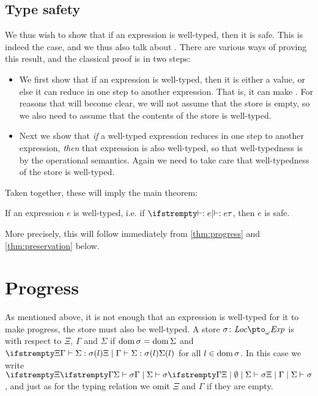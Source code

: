 \subsection{Type safety}

We thus wish to show that if an expression is well-typed, then it is safe. This is indeed the case, and we thus also talk about . There are various ways of proving this result, and the classical proof is in two steps:
%
\begin{itemize}
    \item We first show that if an expression is well-typed, then it is either a value, or else it can reduce in one step to another expression. That is, it can make . For reasons that will become clear, we will not assume that the store is empty, so we also need to assume that the contents of the store is well-typed.

    \item Next we show that \emph{if} a well-typed expression reduces in one step to another expression, \emph{then} that expression is also well-typed, so that well-typedness is  by the operational semantics. Again we need to take care that well-typedness of the store is well-typed.
\end{itemize}
%
Taken together, these will imply the main theorem:

\begin{theoremnoproof}
    If an expression $e$ is well-typed, i.e. if $\typerel{}{}{}{e}{\tau}$, then $e$ is safe.
\end{theoremnoproof}
%
More precisely, this will follow immediately from \cref{thm:progress} and \cref{thm:preservation} below.



\section{Progress}

As mentioned above, it is not enough that an expression is well-typed for it to make progress, the store must also be well-typed. A store $\sigma \colon \setLoc \ptofin \setExp$ is  with respect to $\Xi$, $\Gamma$ and $\Sigma$ if $\operatorname{dom}{\sigma} = \operatorname{dom}{\Sigma}$ and $\typerel{\Xi}{\Gamma}{\Sigma}{\sigma(l)}{\Sigma(l)}$ for all $l \in \operatorname{dom}{\sigma}$. In this case we write $\stotype{\Xi}{\Gamma}{\Sigma}{\sigma}$, and just as for the typing relation we omit $\Xi$ and $\Gamma$ if they are empty.


